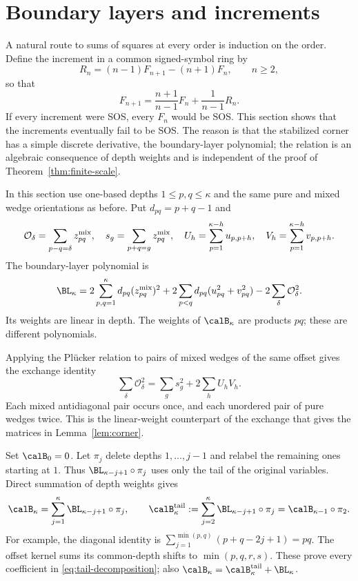 \section{Boundary layers and increments}\label{sec:boundary}
A natural route to sums of squares at every order is induction on the
order. Define the increment in a common signed-symbol ring by
\begin{equation}\label{eq:increment}
                   R_n=(n-1)F_{n+1}-(n+1)F_n,\qquad n\ge2,
\end{equation}
so that
\[
 F_{n+1}=\frac{n+1}{n-1}F_n+\frac1{n-1}R_n .
\]
If every increment were SOS, every $F_n$ would be SOS. This section
shows that the increments eventually fail to be SOS. The reason is that
the stabilized corner has a simple discrete derivative, the
boundary-layer polynomial; the relation is an algebraic consequence of
depth weights and is independent of the proof of
Theorem~\ref{thm:finite-scale}.

In this section use one-based depths $1\le p,q\le \kappa$ and the same pure
and mixed wedge orientations as before. Put $d_{pq}=p+q-1$ and
\[
 \mathcal O_\delta=\sum_{p-q=\delta}z^{\rm mix}_{pq},\quad
 s_g=\sum_{p+q=g}z^{\rm mix}_{pq},\quad
 U_h=\sum_{p=1}^{\kappa-h}u_{p,p+h},\quad
 V_h=\sum_{p=1}^{\kappa-h}v_{p,p+h}.
\]
The boundary-layer polynomial is
\begin{equation}\label{eq:BL}
 \BL_\kappa=2\sum_{p,q=1}^\kappa d_{pq}(z^{\rm mix}_{pq})^2
       +2\sum_{p<q}d_{pq}(u_{pq}^2+v_{pq}^2)
       -2\sum_\delta \mathcal O_\delta^2.
\end{equation}
Its weights are linear in depth. The weights of $\calB_\kappa$ are products
$pq$; these are different polynomials.

Applying the Pl\"ucker relation to pairs of mixed wedges of the same
offset gives the exchange identity
\begin{equation}\label{eq:BL-exchange}
                 \sum_\delta \mathcal O_\delta^2=\sum_gs_g^2+2\sum_hU_hV_h.
\end{equation}
Each mixed antidiagonal pair occurs once, and each unordered pair of
pure wedges twice. This is the linear-weight counterpart of the
exchange that gives the matrices in Lemma~\ref{lem:corner}.

Set $\calB_0=0$. Let $\pi_j$ delete depths $1,\ldots,j-1$ and relabel the remaining ones
starting at $1$. Thus $\BL_{\kappa-j+1}\circ \pi_j$ uses only the tail of the
original variables. Direct summation of depth weights gives
\begin{equation}\label{eq:tail-decomposition}
 \calB_\kappa=\sum_{j=1}^\kappa\BL_{\kappa-j+1}\circ \pi_j,
 \qquad \calB_\kappa^{\rm tail}:=\sum_{j=2}^\kappa\BL_{\kappa-j+1}\circ \pi_j
             =\calB_{\kappa-1}\circ \pi_2.
\end{equation}
For example, the diagonal identity is
$\sum_{j=1}^{\min(p,q)}(p+q-2j+1)=pq$.
The offset kernel sums its common-depth shifts to
$\min(p,q,r,s)$. These prove every coefficient in
\eqref{eq:tail-decomposition}; also $\calB_\kappa=\calB_\kappa^{\rm tail}+\BL_\kappa$.


